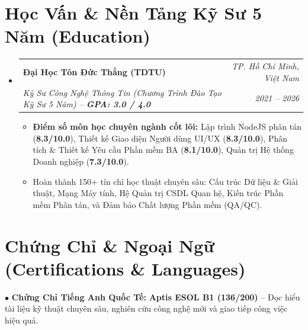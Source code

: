 \documentclass[letterpaper,10pt]{article}
\makeatletter
\newcommand{\resumeItem}[1]{
  \item\small{{#1}}
}
\newcommand{\resumeSubheading}[4]{
  \vspace{2pt}\item
    \begin{tabular*}{0.98\textwidth}[t]{l@{\extracolsep{\fill}}r}
      \textbf{\color{primaryDark}#1} & \textit{\small\color{subtleSlate}#2} \\
      \textit{\small#3} & \textit{\small\color{subtleSlate}#4} \\
    \end{tabular*}\vspace{-2pt}
}
\newcommand{\resumeSubHeadingListStart}{\begin{itemize}[leftmargin=0.15in, label={}, itemsep=3pt, topsep=1pt]}
\newcommand{\resumeSubHeadingListEnd}{\end{itemize}\vspace{-2pt}}
\newcommand{\resumeItemListStart}{\begin{itemize}[leftmargin=0.15in, itemsep=1.2pt, parsep=0pt, topsep=1pt]}
\newcommand{\resumeItemListEnd}{\end{itemize}}
\makeatother
\begin{document}
\section{Học Vấn \& Nền Tảng Kỹ Sư 5 Năm (Education)}
  \resumeSubHeadingListStart
    \resumeSubheading
      {Đại Học Tôn Đức Thắng (TDTU)}{TP. Hồ Chí Minh, Việt Nam}
      {Kỹ Sư Công Nghệ Thông Tin (Chương Trình Đào Tạo Kỹ Sư 5 Năm) -- \textbf{GPA: 3.0 / 4.0}}{2021 -- 2026}
      \resumeItemListStart
        \resumeItem{\textbf{Điểm số môn học chuyên ngành cốt lõi:} Lập trình NodeJS phân tán (\textbf{8.3/10.0}), Thiết kế Giao diện Người dùng UI/UX (\textbf{8.3/10.0}), Phân tích \& Thiết kế Yêu cầu Phần mềm BA (\textbf{8.1/10.0}), Quản trị Hệ thống Doanh nghiệp (\textbf{7.3/10.0}).}
        \resumeItem{Hoàn thành 150+ tín chỉ học thuật chuyên sâu: Cấu trúc Dữ liệu \& Giải thuật, Mạng Máy tính, Hệ Quản trị CSDL Quan hệ, Kiến trúc Phần mềm Phân tán, và Đảm bảo Chất lượng Phần mềm (QA/QC).}
      \resumeItemListEnd
  \resumeSubHeadingListEnd

\section{Chứng Chỉ \& Ngoại Ngữ (Certifications \& Languages)}
 \begin{itemize}[leftmargin=0.15in, label={}, itemsep=3pt, topsep=1pt]
    \small{\item{
     $\bullet$ \textbf{Chứng Chỉ Tiếng Anh Quốc Tế:} \textbf{Aptis ESOL B1 (136/200)} -- Đọc hiểu tài liệu kỹ thuật chuyên sâu, nghiên cứu công nghệ mới và giao tiếp công việc hiệu quả.
    }}
 \end{itemize}
\end{document}
